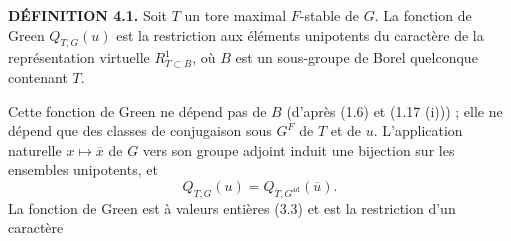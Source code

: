 \documentclass[9pt,twoside]{extarticle}
\begin{document}
{\noindent\textbf{DÉFINITION 4.1.} Soit \(T\) un tore maximal \(F\)-stable de \(G\). La fonction de Green \(Q_{T,G}(u)\) est la restriction aux éléments unipotents du caractère de la représentation virtuelle \(R_{T\subset B}^1\), où \(B\) est un sous-groupe de Borel quelconque contenant \(T\).\par

Cette fonction de Green ne dépend pas de \(B\) (d'après (1.6) et (1.17 (i))) ; elle ne dépend que des classes de conjugaison sous \(G^F\) de \(T\) et de \(u\). L'application naturelle \(x\mapsto\overline x\) de \(G\) vers son groupe adjoint induit une bijection sur les ensembles unipotents, et \[
\tag{4.1.1}
Q_{T,G}(u)=Q_{\overline T,G^{\mathrm{ad}}}(\overline u).
\] La fonction de Green est à valeurs entières (3.3) et est la restriction d'un caractère\par
}
\end{document}
